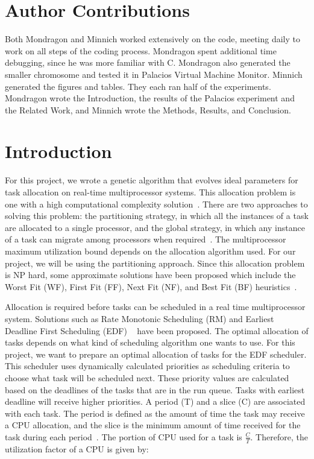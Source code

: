 \documentclass[11pt]{article}
\begin{document}
\maketitle
\doublespacing

\section{Author Contributions}
Both Mondragon and Minnich worked extensively on the code, meeting daily to work on all steps of the coding process. Mondragon spent additional time debugging, since he was more familiar with C. Mondragon also generated the smaller chromosome and tested it in Palacios Virtual Machine Monitor. Minnich generated the figures and tables. They each ran half of the experiments. Mondragon wrote the Introduction, the results of the Palacios experiment and the Related Work, and Minnich wrote the Methods, Results, and Conclusion.

\section{Introduction}

For this project, we wrote a genetic algorithm that evolves ideal parameters for task allocation on real-time multiprocessor systems. This allocation problem is one with a high computational complexity solution~\cite{Mondragon:13}. There are two approaches to solving this problem: the partitioning strategy, in which all the instances of a task are allocated to a single processor, and the global strategy, in which any instance of a task can migrate among processors when required~\cite{Lopez:04}. The multiprocessor maximum utilization bound depends on the allocation algorithm used. For our project, we will be using the partitioning approach.  Since this allocation problem is NP hard, some approximate solutions have been proposed which include the Worst Fit (WF), First Fit (FF), Next Fit (NF), and Best Fit (BF) heuristics~\cite{Zapata:05}. 

Allocation is required before tasks can be scheduled in a real time multiprocessor system. Solutions such as Rate Monotonic Scheduling (RM) and Earliest Deadline First Scheduling (EDF) ~\cite{Dall:78} have been proposed. The optimal allocation of tasks depends on what kind of scheduling algorithm one wants to use. For this project, we want to prepare an optimal allocation of tasks for the EDF scheduler. This scheduler uses dynamically calculated priorities as scheduling criteria to choose what task will be scheduled next. These priority values are calculated based on the deadlines of the tasks that are in the run queue. Tasks with earliest deadline will receive higher priorities. A period (T) and a slice (C) are associated with each task. The period is defined as the amount of time the task may receive a CPU allocation, and the slice is the minimum amount of time received for the task during each period~\cite{Chung:73}. The portion of CPU used for a task is $\frac{C}{T}$. Therefore, the utilization factor of a CPU is given by: 
\end{document}
